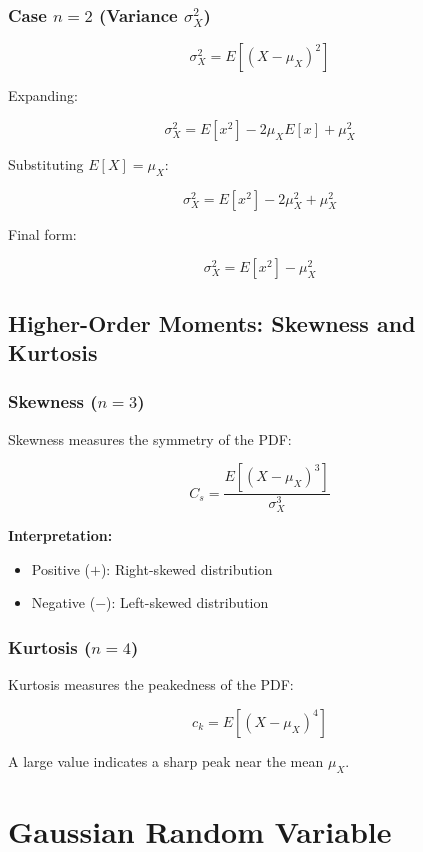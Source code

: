 \documentclass[12pt]{article}
\begin{document}
\subsubsection{Case $n=2$ (Variance $\sigma_X^2$)}

\[
\sigma_X^2 = E[(X - \mu_X)^2]
\]

Expanding:

\[
\sigma_X^2 = E[x^2] - 2\mu_X E[x] + \mu_X^2
\]

Substituting $E[X] = \mu_X$:

\[
\sigma_X^2 = E[x^2] - 2\mu_X^2 + \mu_X^2
\]

Final form:

\[
\sigma_X^2 = E[x^2] - \mu_X^2
\]

\subsection{Higher-Order Moments: Skewness and Kurtosis}

\subsubsection{Skewness ($n=3$)}

Skewness measures the symmetry of the PDF:

\[
C_s = \frac{E[(X - \mu_X)^3]}{\sigma_X^3}
\]

\textbf{Interpretation:}

\begin{itemize}
    \item Positive ($+$): Right-skewed distribution
    \item Negative ($-$): Left-skewed distribution
\end{itemize}

\subsubsection{Kurtosis ($n=4$)}

Kurtosis measures the peakedness of the PDF:

\[
c_k = E[(X - \mu_X)^4]
\]

A large value indicates a sharp peak near the mean $\mu_X$.

\section{Gaussian Random Variable}
\end{document}
